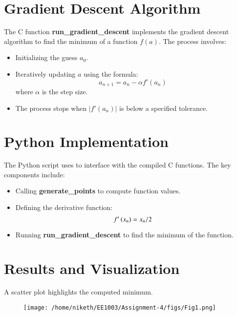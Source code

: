 \documentclass[journal]{IEEEtran}
\begin{document}
\section{Gradient Descent Algorithm}
The C function \textbf{run\_gradient\_descent} implements the gradient descent algorithm to find the minimum of a function $f(a)$. The process involves:
\begin{itemize}
    \item Initializing the guess $a_0$.
    \item Iteratively updating $a$ using the formula:
    \begin{equation}
        a_{n+1} = a_n - \alpha f'(a_n)
    \end{equation}
    where $\alpha$ is the step size.
    \item The process stops when $|f'(a_n)|$ is below a specified tolerance.
\end{itemize}

\section{Python Implementation}
The Python script uses  to interface with the compiled C functions. The key components include:
\begin{itemize}
    \item Calling \textbf{generate\_points} to compute function values.
    \item Defining the derivative function:
    \begin{equation}
        f^{\prime}\left(x_n\right) = x_n/2
    \end{equation}
    \item Running \textbf{run\_gradient\_descent} to find the minimum of the function.
\end{itemize}

\section{Results and Visualization}
A scatter plot highlights the computed minimum.
\begin{figure}[!ht]
    \centering
    \texttt{[image: /home/niketh/EE1003/Assignment-4/figs/Fig1.png]}
    \caption{}
\end{figure}
\end{document}
